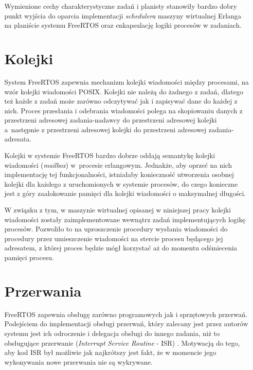 Wymienione cechy charakterystyczne zadań i planisty stanowiły bardzo dobry punkt wyjścia do oparcia implementacji \emph{schedulera} maszyny wirtualnej Erlanga na planiście systemu FreeRTOS oraz enkapsulację logiki procesów w zadaniach.

\section{Kolejki}
\label{sec:rtosKolejki}

System FreeRTOS zapewnia mechanizm kolejki wiadomości między procesami, na wzór kolejki wiadomości POSIX. Kolejki nie należą do żadnego z zadań, dlatego też każde z zadań może zarówno odczytywać jak i zapisywać dane do każdej z nich. Proces przesłania i odebrania wiadomości polega na skopiowaniu danych z przestrzeni adresowej zadania-nadawcy do przestrzeni adresowej kolejki a~następnie z przestrzeni adresowej kolejki do przestrzeni adresowej zadania-adresata.

Kolejki w systemie FreeRTOS bardzo dobrze oddają semantykę kolejki wiadomości (\emph{mailbox}) w~procesie erlangowym. Jednakże, aby oprzeć na nich implementację tej funkcjonalności, istniałaby konieczność utworzenia osobnej kolejki dla każdego z uruchomionych w systemie procesów, do czego konieczne jest z góry zaalokowanie pamięci dla kolejki wiadomości o maksymalnej długości.

W związku z tym, w maszynie wirtualnej opisanej w niniejszej pracy kolejki wiadomości zostały zaimplementowane wewnątrz zadań implementujących logikę procesów. Pozwoliło to na uproszczenie procedury wysłania wiadomości do procedury przez umieszczenie wiadomości na stercie procesu będącego jej adresatem, z której proces będzie mógł korzystać aż do momentu odśmiecenia pamięci procesu. 

\section{Przerwania}
\label{sec:rtosPrzerwania}

FreeRTOS zapewnia obsługę zarówno programowych jak i sprzętowych przerwań. Podejściem do implementacji obsługi przerwań, który zalecany jest przez autorów systemu jest ich odroczenie i delegacja obsługi do innego zadania, niż to obsługujące przerwanie (\emph{Interrupt Service Routine} - ISR) \cite{Barry2011}. Motywacją do tego, aby kod ISR był możliwie jak najkrótszy jest fakt, że w momencie jego wykonywania nowe przerwania nie są wykrywane.

